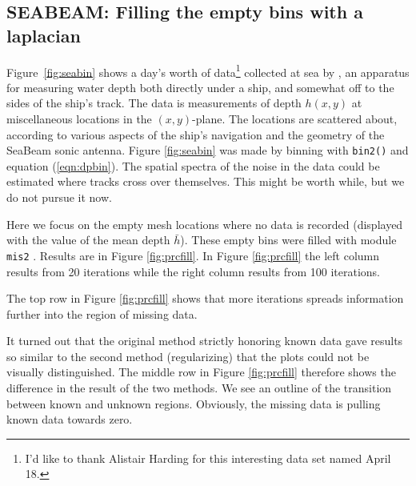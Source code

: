 

\subsection{SEABEAM: Filling the empty bins with a laplacian}

Figure~\ref{fig:seabin} shows a day's worth of data\footnote{
        I'd like to thank Alistair Harding
        for this interesting data set
        named April 18.
        }
collected at sea by ,
an apparatus for measuring water depth both
directly under a ship, and somewhat off to the sides of the ship's track.
The data is measurements of depth $h(x,y)$ at miscellaneous locations
in the $(x,y)$-plane.
The locations are scattered about,
according to various aspects
of the ship's navigation and the geometry of the SeaBeam sonic antenna.
Figure \ref{fig:seabin} was made by binning with
\texttt{bin2()} 
and equation (\ref{eqn:dpbin}).
The spatial spectra of the noise in the data
could be estimated where tracks cross over themselves.
This might be worth while, but we do not pursue it now.


\par
Here we focus on the empty mesh locations where no data is recorded
(displayed with the value of the mean depth $\bar h$).
These empty bins were filled with
module \texttt{mis2} .
Results are in Figure \ref{fig:prcfill}.
In Figure \ref{fig:prcfill} the left column results from 20 iterations
while the right column results from 100 iterations.
\par
The top row in Figure \ref{fig:prcfill} shows that more iterations
spreads information further into the region of missing data.
\par
It turned out that the original method strictly honoring known data
gave results so similar to the second method (regularizing)
that the plots could not be visually distinguished.
The middle row in Figure \ref{fig:prcfill} therefore shows
the difference in the result of the two methods.
We see an outline of the transition between known and unknown regions.
Obviously, the missing data is pulling known data towards zero.

